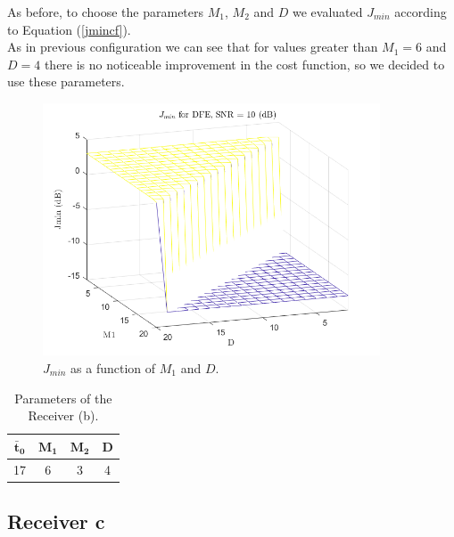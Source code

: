 \documentclass[a4paper, 12pt]{report}
\begin{document}
As before, to choose the parameters $M_1$, $M_2$ and $D$ we evaluated $J_{min}$ according to Equation (\ref{jmincf}).\\
As in previous configuration we can see that for values greater than $M_1=6$ and $D=4$ there is no noticeable improvement in the cost function, so we decided to use these parameters.

\begin{figure}[H]
	\centering
	\includegraphics[width=10cm]{images/optimal_params_DFE}
	\caption{$J_{min}$ as a function of $M_1$ and $D$.}\label{j_min_dfe}
\end{figure}

\begin{table}[H]
	\centering
	\begin{tabular}{c c c c}
		\toprule
		$\mathbf{\bar{t}_0}$ & $\mathbf{M_1}$ & $\mathbf{M_2}$ & \textbf{D}     \\
		\midrule
		17 & 6 & 3 & 4 \\
		\bottomrule			
	\end{tabular}
	\caption{Parameters of the Receiver (b).}
	\label{Tab_b}
\end{table}

\clearpage
\subsection*{Receiver c}
\end{document}
